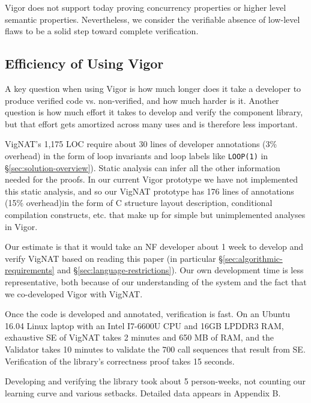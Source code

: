 \documentclass[letterpaper,twocolumn,10pt]{article}
\newcommand{\code}[1]{\texttt{#1}}
\newcommand{\vignat}{{\sc VigNAT}\xspace}
\begin{document}
{\begin{enumerate}
\end{enumerate}

Vigor does not support today proving concurrency properties or higher level semantic properties. Nevertheless, we consider the verifiable absence of low-level flaws to be a solid step toward complete verification.

\subsection{Efficiency of Using Vigor}
\label{sec:efficiency}

A key question when using Vigor is how much longer does it take a developer to produce verified code vs. non-verified, and how much harder is it.  Another question is how much effort it takes to develop and verify the component library, but that effort gets amortized across many uses and is therefore less important.

\vignat's 1,175 LOC require about 30 lines of developer annotations (3\% overhead) in the form of loop invariants and loop labels like \code{LOOP(1)} in \S\ref{sec:solution-overview}). Static analysis can infer all the other information needed for the proofs. In our current Vigor prototype we have not implemented this static analysis, and so our \vignat prototype has 176 lines of annotations (15\% overhead)in the form of C structure layout description, conditional compilation constructs, etc. that make up for simple but unimplemented analyses in Vigor.

Our estimate is that it would take an NF developer about 1 week to develop and verify \vignat based on reading this paper (in particular \S\ref{sec:algorithmic-requirements} and \S\ref{sec:language-restrictions}). Our own development time is less representative, both because of our understanding of the system and the fact that we co-developed Vigor with \vignat.

Once the code is developed and annotated, verification is fast. On an Ubuntu 16.04 Linux laptop with an Intel I7-6600U CPU and 16GB LPDDR3 RAM, exhaustive SE of \vignat takes 2 minutes and 650 MB of RAM, and the Validator takes 10 minutes to validate the 700 call sequences that result from SE. Verification of the library's correctness proof takes 15 seconds.

\medskip 

Developing and verifying the library took about 5 person-weeks, not counting our learning curve and various setbacks. Detailed data appears in Appendix B.

}
\end{document}

